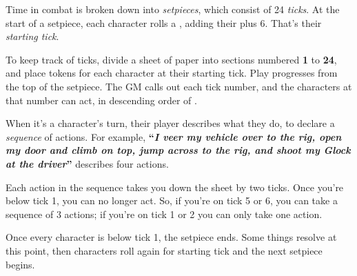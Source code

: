 
Time in combat is broken down into \emph{setpieces}, which consist of 24 \emph{ticks}. At the start of a setpiece, each character rolls a , adding their  plus 6. That's their \emph{starting tick}.

To keep track of ticks, divide a sheet of paper into sections numbered \textbf{1} to \textbf{24}, and place tokens for each character at their starting tick. Play progresses from the top of the setpiece. The GM calls out each tick number, and the characters at that number can act, in descending order of .

When it's a character's turn, their player describes what they do, to declare a \emph{sequence} of actions. For example, \textbf{``\emph{I veer my vehicle over to the rig, open my door and climb on top, jump across to the rig, and shoot my Glock at the driver}''} describes four actions.

Each action in the sequence takes you down the sheet by two ticks. Once you're below tick 1, you can no longer act. So, if you're on tick 5 or 6, you can take a sequence of 3 actions; if you're on tick 1 or 2 you can only take one action.

Once every character is below tick 1, the setpiece ends. Some things resolve at this point, then characters roll again for starting tick and the next setpiece begins.
